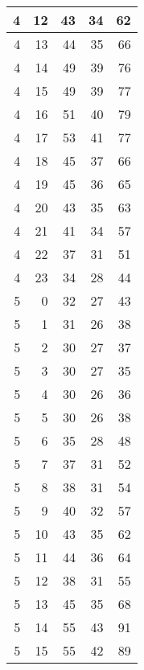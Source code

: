 \begin{longtable}{|r|r|r|r|r|}
    \hline
    4     & 12    & 43    & 34    & 62 \\
    \hline
    4     & 13    & 44    & 35    & 66 \\
    \hline
    4     & 14    & 49    & 39    & 76 \\
    \hline
    4     & 15    & 49    & 39    & 77 \\
    \hline
    4     & 16    & 51    & 40    & 79 \\
    \hline
    4     & 17    & 53    & 41    & 77 \\
    \hline
    4     & 18    & 45    & 37    & 66 \\
    \hline
    4     & 19    & 45    & 36    & 65 \\
    \hline
    4     & 20    & 43    & 35    & 63 \\
    \hline
    4     & 21    & 41    & 34    & 57 \\
    \hline
    4     & 22    & 37    & 31    & 51 \\
    \hline
    4     & 23    & 34    & 28    & 44 \\
    \hline
    5     & 0     & 32    & 27    & 43 \\
    \hline
    5     & 1     & 31    & 26    & 38 \\
    \hline
    5     & 2     & 30    & 27    & 37 \\
    \hline
    5     & 3     & 30    & 27    & 35 \\
    \hline
    5     & 4     & 30    & 26    & 36 \\
    \hline
    5     & 5     & 30    & 26    & 38 \\
    \hline
    5     & 6     & 35    & 28    & 48 \\
    \hline
    5     & 7     & 37    & 31    & 52 \\
    \hline
    5     & 8     & 38    & 31    & 54 \\
    \hline
    5     & 9     & 40    & 32    & 57 \\
    \hline
    5     & 10    & 43    & 35    & 62 \\
    \hline
    5     & 11    & 44    & 36    & 64 \\
    \hline
    5     & 12    & 38    & 31    & 55 \\
    \hline
    5     & 13    & 45    & 35    & 68 \\
    \hline
    5     & 14    & 55    & 43    & 91 \\
    \hline
    5     & 15    & 55    & 42    & 89 \\

\end{longtable}

